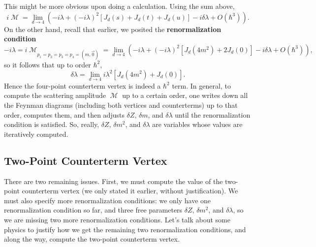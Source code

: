 \documentclass{report}
\theoremstyle{plain}
\theoremstyle{definition}
\theoremstyle{remark}
\DeclareMathOperator{\cM}{\mathcal{M}}
\begin{document}
This might be more obvious upon doing a calculation. Using the sum
above,
$$ i\cM = \lim_{d \to 4} (-i\lambda + (-i\lambda)^2[J_d(s) + J_d(t) + J_d(u)] - i\delta\lambda + O(\hbar^3)). $$
On the other hand, recall that earlier, we posited the {\bf
  renormalization condition}
$$ -i\lambda = i\cM_{p_1=p_2=p_3=p_4=(m,\vec{0})} = \lim_{d \to 4} (-i\lambda + (-i\lambda)^2[J_d(4m^2) + 2J_d(0)] - i\delta\lambda + O(\hbar^3)), $$
so it follows that up to order $\hbar^2$,
$$ \delta\lambda = \lim_{d \to 4} i\lambda^2[J_d(4m^2) + J_d(0)]. $$
Hence the four-point counterterm vertex is indeed a $\hbar^2$ term. In
general, to compute the scattering amplitude $\cM$ up to a certain
order, one writes down all the Feynman diagrams (including both
vertices and counterterms) up to that order, computes them, and then
adjusts $\delta Z$, $\delta m$, and $\delta\lambda$ until the
renormalization condition is satisfied. So, really, $\delta Z$,
$\delta m^2$, and $\delta\lambda$ are variables whose values are
iteratively computed.

\subsection{Two-Point Counterterm Vertex}

There are two remaining issues. First, we must compute the value of
the two-point counterterm vertex (we only stated it earlier, without
justification). We must also specify more renormalization conditions:
we only have one renormalization condition so far, and three free
parameters $\delta Z$, $\delta m^2$, and $\delta \lambda$, so we are
missing two more renormalization conditions. Let's talk about some
physics to justify how we get the remaining two renormalization
conditions, and along the way, compute the two-point counterterm
vertex.
\end{document}
